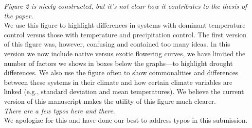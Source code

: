 \documentclass[11pt,a4paper]{letter}
\begin{document}
\begin{letter}{}
\emph{Figure 2 is nicely constructed, but it's not clear how it contributes to the thesis of the paper.}\\

We use this figure to highlight differences in systems with dominant temperature control versus those with temperature and precipitation control. The first version of this figure was, however, confusing and contained too many ideas. In this version we now include native versus exotic flowering curves, we have limited the number of factors we shows in boxes below the graphs---to highlight drought differences. We also use the figure often to show commonalities and differences between these systems in their climate and how certain climate variables are linked (e.g., standard deviation and mean temperatures). We believe the current version of this manuscript makes the utility of this figure much clearer. \\

\emph{There are a few typos here and there.}\\

We apologize for this and have done our best to address typos in this submission.\\


\end{letter}
\end{document}
